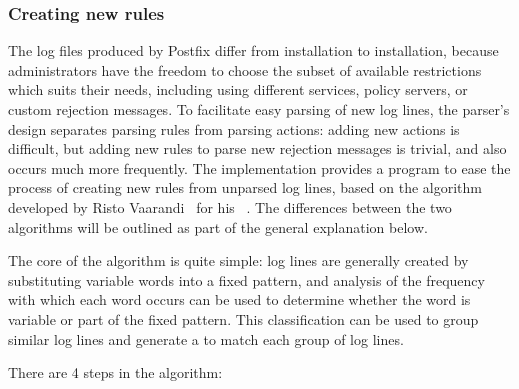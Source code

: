 \subsubsection{Creating new rules}

\label{creating new rules}

The log files produced by Postfix differ from installation to installation,
because administrators have the freedom to choose the subset of available
restrictions which suits their needs, including using different \DNSBL{}
services, policy servers, or custom rejection messages.  To facilitate easy
parsing of new log lines, the parser's design separates parsing rules from
parsing actions: adding new actions is difficult, but adding new rules to
parse new rejection messages is trivial, and also occurs much more
frequently.  The implementation provides a program to ease the process of
creating new rules from unparsed log lines, based on the algorithm
developed by Risto Vaarandi~\cite{risto-vaarandi} for his
\SLCT{}~\cite{slct-paper}.  The differences between the two algorithms will
be outlined as part of the general explanation below.

The core of the algorithm is quite simple: log lines are generally created
by substituting variable words into a fixed pattern, and analysis of the
frequency with which each word occurs can be used to determine whether the
word is variable or part of the fixed pattern.  This classification can be
used to group similar log lines and generate a \regex{} to match each group
of log lines.

There are 4 steps in the algorithm:

